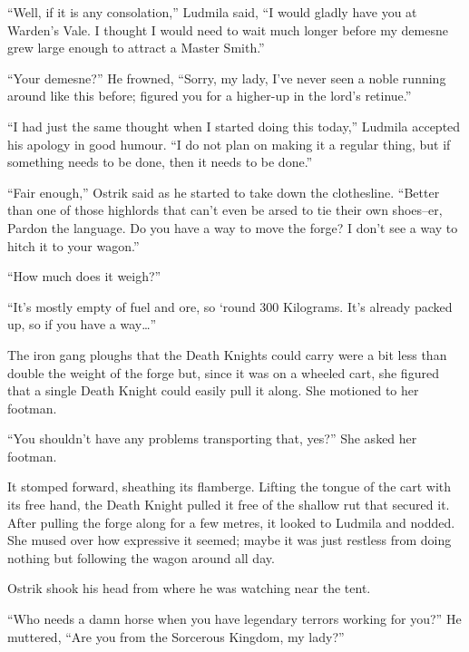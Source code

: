“Well, if it is any consolation,” Ludmila said, “I would gladly have you at Warden’s Vale. I thought I would need to wait much longer before my demesne grew large enough to attract a Master Smith.”

 

“Your demesne?” He frowned, “Sorry, my lady, I’ve never seen a noble running around like this before; figured you for a higher-up in the lord’s retinue.”

 

“I had just the same thought when I started doing this today,” Ludmila accepted his apology in good humour. “I do not plan on making it a regular thing, but if something needs to be done, then it needs to be done.”

 

“Fair enough,” Ostrik said as he started to take down the clothesline. “Better than one of those highlords that can’t even be arsed to tie their own shoes–er, Pardon the language. Do you have a way to move the forge? I don’t see a way to hitch it to your wagon.”

 

“How much does it weigh?”

 

“It’s mostly empty of fuel and ore, so ‘round 300 Kilograms. It’s already packed up, so if you have a way…”

 

The iron gang ploughs that the Death Knights could carry were a bit less than double the weight of the forge but, since it was on a wheeled cart, she figured that a single Death Knight could easily pull it along. She motioned to her footman.

 

“You shouldn’t have any problems transporting that, yes?” She asked her footman.

 

It stomped forward, sheathing its flamberge. Lifting the tongue of the cart with its free hand, the Death Knight pulled it free of the shallow rut that secured it. After pulling the forge along for a few metres, it looked to Ludmila and nodded. She mused over how expressive it seemed; maybe it was just restless from doing nothing but following the wagon around all day.

 

Ostrik shook his head from where he was watching near the tent.

 

“Who needs a damn horse when you have legendary terrors working for you?” He muttered, “Are you from the Sorcerous Kingdom, my lady?”

